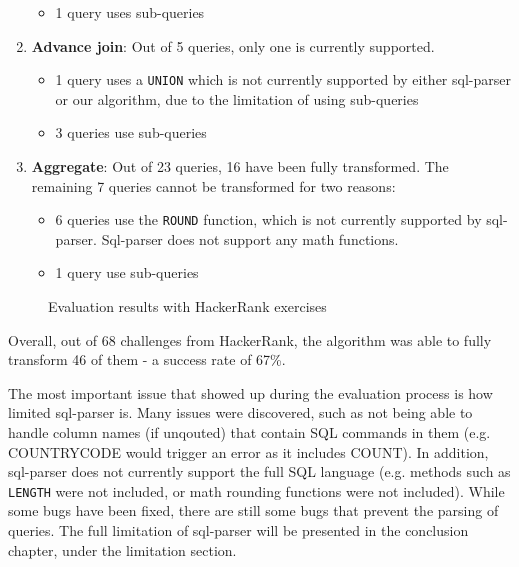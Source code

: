 \begin{enumerate}
\begin{itemize}
        \item 1 query uses sub-queries
    \end{itemize}
    \item \textbf{Advance join}: Out of 5 queries, only one is currently supported.
    \begin{itemize}
        \item 1 query uses a \texttt{UNION} which is not currently supported by either sql-parser or our algorithm, due to the limitation of using sub-queries
        \item 3 queries use sub-queries
    \end{itemize}
    \item \textbf{Aggregate}: Out of 23 queries, 16 have been fully transformed. The remaining 7 queries cannot be transformed for two reasons:
    \begin{itemize}
        \item 6 queries use the \texttt{ROUND} function, which is not currently supported by sql-parser. Sql-parser does not support any math functions.
        \item 1 query use sub-queries
    \end{itemize}
\end{enumerate}

\begin{figure}
\centering
{}
\caption{Evaluation results with HackerRank exercises}
\label{fig:my_label}
\end{figure}

Overall, out of 68 challenges from HackerRank, the algorithm was able to fully transform 46 of them - a success rate of 67\%. 

The most important issue that showed up during the evaluation process is how limited sql-parser is. Many issues were discovered, such as not being able to handle column names (if unqouted) that contain SQL commands in them (e.g. COUNTRYCODE would trigger an error as it includes COUNT). In addition, sql-parser does not currently support the full SQL language (e.g. methods such as \texttt{LENGTH} were not included, or math rounding functions were not included). While some bugs have been fixed, there are still some bugs that prevent the parsing of queries. The full limitation of sql-parser will be presented in the conclusion chapter, under the limitation section.


